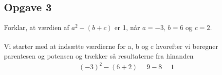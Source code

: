 \subsection{Opgave 3}

Forklar, at værdien af $a^2 - (b+c)$ er 1, når $a = -3$, $b = 6$ og $c = 2$.\\\\

\ans
Vi starter med at indsætte værdierne for a, b og c hvorefter vi beregner parentesen og potensen og trækker så resultaterne fra hinanden
\begin{align*}
    (-3)^2 - (6 + 2) = 9 - 8 = 1
\end{align*}

